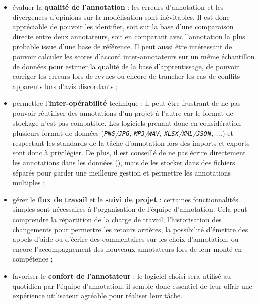 \begin{itemize}
			\item évaluer la \textbf{qualité de l'annotation} :
				les erreurs d'annotation et les divergences d'opinions sur la modélisation sont inévitables.
				Il est donc appréciable de pouvoir les identifier, soit sur la base d'une comparaison directe entre deux annotateurs, soit en comparant avec l'annotation la plus probable issue d'une base de référence.
				Il peut aussi être intéressant de pouvoir calculer les scores d'accord inter-annotateurs sur un même échantillon de données pour estimer la qualité de la base d'apprentissage, de pouvoir corriger les erreurs lors de revues ou encore de trancher les cas de conflits apparents lors d'avis discordants ;
			\item permettre l'\textbf{inter-opérabilité} technique :
				il peut être frustrant de ne pas pouvoir réutiliser des annotations d'un projet à l'autre car le format de stockage n'est pas compatible.
				Les logiciels prenant donc en considération plusieurs format de données (\textit{\texttt{PNG}/\texttt{JPG}, \texttt{MP3}/\texttt{WAV}, \texttt{XLSX}/\texttt{XML}/\texttt{JSON}, ...}) et respectant les standards de la tâche d'annotation lors des imports et exports sont donc à privilégier.
				De plus, il est conseillé de ne pas écrire directement les annotations dans les données (), mais de les stocker dans des fichiers séparés pour garder une meilleure gestion et permettre les annotations multiples ;
			\item gérer le \textbf{flux de travail} et le \textbf{suivi de projet} :
				certaines fonctionnalités simples sont nécessaires à l'organisation de l'équipe d'annotation.
				Cela peut comprendre la répartition de la charge de travail, l'historisation des changements pour permettre les retours arrières, la possibilité d'émettre des appels d'aide ou d'écrire des commentaires sur les choix d'annotation, ou encore l'accompagnement des nouveaux annotateurs lors de leur monté en compétence ;
			\item favoriser le \textbf{confort de l'annotateur} :
				le logiciel choisi sera utilisé au quotidien par l'équipe d'annotation, il semble donc essentiel de leur offrir une expérience utilisateur agréable pour réaliser leur tâche.

\end{itemize}
